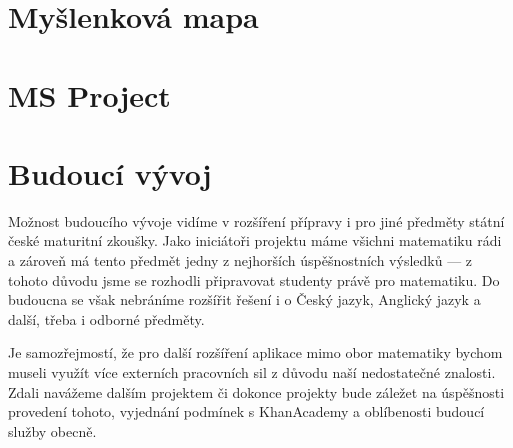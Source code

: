 \documentclass[12pt, a4paper]{report}
\begin{document}
\chapter{Myšlenková mapa}
\label{sec:org39bbf51}



\chapter{MS Project}
\label{sec:org90079c1}
\chapter{Budoucí vývoj}
\label{sec:orgde1ea73}

Možnost budoucího vývoje vidíme v rozšíření přípravy i pro jiné předměty státní české maturitní zkoušky. Jako iniciátoři projektu máme všichni matematiku rádi a zároveň má tento předmět jedny z nejhorších úspěšnostních výsledků --- z tohoto důvodu jsme se rozhodli připravovat studenty právě pro matematiku. Do budoucna se však nebráníme rozšířit řešení i o Český jazyk, Anglický jazyk a další, třeba i odborné předměty.

Je samozřejmostí, že pro další rozšíření aplikace mimo obor matematiky bychom museli využít více externích pracovních sil z důvodu naší nedostatečné znalosti. Zdali navážeme dalším projektem či dokonce projekty bude záležet na úspěšnosti provedení tohoto, vyjednání podmínek s KhanAcademy a oblíbenosti budoucí služby obecně.
\end{document}

